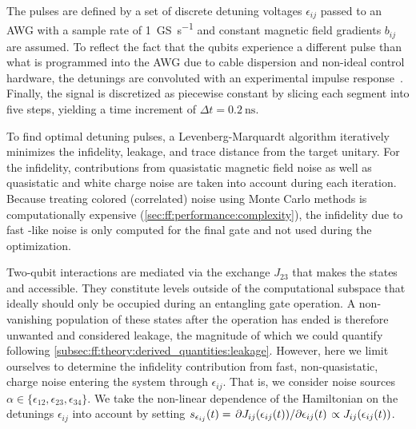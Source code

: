The pulses are defined by a set of discrete detuning voltages $\epsilon_{ij}$ passed to an AWG with a sample rate of \qty{1}{\giga S\per\second} and constant magnetic field gradients $b_{ij}$ are assumed.
To reflect the fact that the qubits experience a different pulse than what is programmed into the AWG due to cable dispersion and non-ideal control hardware, the detunings are convoluted with an experimental impulse response~\cite{Cerfontaine2020b}.
Finally, the signal is discretized as piecewise constant by slicing each segment into five steps, yielding a time increment of $\Delta t = \qty{0.2}{\nano\second}$.

To find optimal detuning pulses, a Levenberg-Marquardt algorithm iteratively minimizes the infidelity, leakage, and trace distance from the target unitary.
For the infidelity, contributions from quasistatic magnetic field noise as well as quasistatic and white charge noise are taken into account during each iteration.
Because treating colored (correlated) noise using Monte Carlo methods is computationally expensive (\cf \cref{sec:ff:performance:complexity}), the infidelity due to fast \oneoverf-like noise is only computed for the final gate and not used during the optimization.

Two-qubit interactions are mediated via the exchange $J_{23}$ that makes the states \ketuudd and \ketdduu accessible.
They constitute levels outside of the computational subspace that ideally should only be occupied during an entangling gate operation.
A non\hyp{}vanishing population of these states after the operation has ended is therefore unwanted and considered leakage, the magnitude of which we could quantify following \cref{subsec:ff:theory:derived_quantities:leakage}.
However, here we limit ourselves to determine the infidelity contribution from fast, \viz non-quasistatic, charge noise entering the system through $\epsilon_{ij}$.
That is, we consider noise sources $\alpha\in\lbrace\epsilon_{12},\epsilon_{23},\epsilon_{34}\rbrace$.
We take the non-linear dependence of the Hamiltonian on the detunings $\epsilon_{ij}$ into account by setting $s_{\epsilon_{ij}}(t) = \pdv*{J_{ij}(\epsilon_{ij}(t))}{\epsilon_{ij}(t)}\propto J_{ij}(\epsilon_{ij}(t))$.

